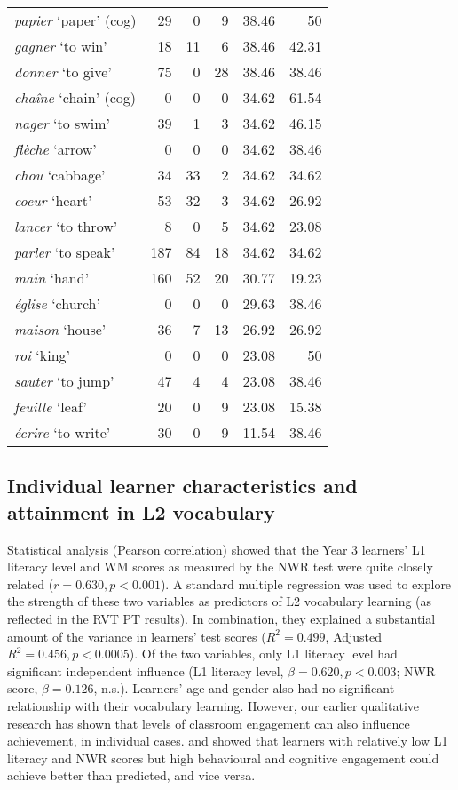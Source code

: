 \documentclass[output=paper]{langscibook}
\begin{document}
\begin{longtable}{lrrrrr}
    \textit{papier} `paper' (cog) &	29 &	0	& 9	& 38.46 &	50\phantom{.00}\\
    \textit{gagner} `to win' &	18 &	11 &	6 &	38.46 &	42.31\\
    \textit{donner} `to give' &	75 &	0 &	28 &	38.46 &	38.46\\
    \textit{chaîne} `chain' (cog) &	0 &	0 &	0 &	34.62 &	61.54\\
    \textit{nager} `to swim'	& 39 &	1 &	3	& 34.62 &	46.15\\
    \textit{flèche} `arrow'	& 0 &	0 &	0 &	34.62 &	38.46\\
    \textit{chou} `cabbage' &	34 &	33 &	2 &	34.62 &	34.62\\
    \textit{coeur} `heart' &	53 &	32 &	3	& 34.62 &	26.92\\
    \textit{lancer} `to throw' &	8 &	0	& 5	& 34.62 &	23.08\\
    \textit{parler} `to speak' &	187	& 84 &	18 &	34.62 &	34.62\\
    \textit{main} `hand'	& 160 &	52 &	20 &	30.77 &	19.23\\
    \textit{église} `church' &	0 &	0 &	0 &	29.63 &	38.46\\
    \textit{maison} `house' &	36 &	7 &	13 &	26.92 &	26.92\\
    \textit{roi} `king'	& 0	& 0	& 0 &	23.08 &	50\phantom{.00}\\
    \textit{sauter} `to jump' &	47 &	4 &	4 &	23.08 &	38.46\\
    \textit{feuille} `leaf' &	20 &	0 &	9 &	23.08 &	15.38\\
    \textit{écrire} `to write' &	30 &	0 &	9 &	11.54 &	38.46\\
\end{longtable}

\subsection{Individual learner characteristics and attainment in L2 vocabulary}

Statistical analysis (Pearson correlation) showed that the Year 3 learners’ L1 literacy level and WM scores as measured by the NWR test were quite closely related ($r = 0.630,\allowbreak p < 0.001$). A standard multiple regression was used to explore the strength of these two variables as predictors of L2 vocabulary learning (as reflected in the RVT PT results). In combination, they explained a substantial amount of the variance in learners’ test scores ($R^2 = 0.499$, Adjusted $R^2 = 0.456,\allowbreak p < 0.0005$). Of the two variables, only L1 literacy level had significant independent influence (L1 literacy level, $\beta = 0.620,\allowbreak p < 0.003$; NWR score, $\beta = 0.126$, n.s.). Learners’ age and gender also had no significant relationship with their vocabulary learning. However, our earlier qualitative research has shown that levels of classroom engagement can also influence achievement, in individual cases. \citet{MitchellRule2016} and \citet{MitchellMyles2019} showed that learners with relatively low L1 literacy and NWR scores but high behavioural and cognitive engagement could achieve better than predicted, and vice versa.
\end{document}
